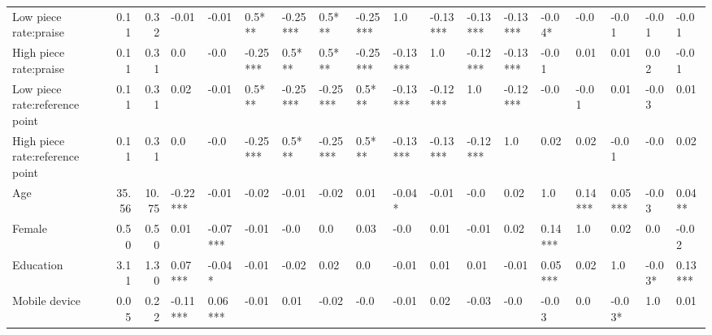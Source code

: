 \begin{tabular}{lrrlllllllllllllll}
Low piece rate:praise           &  0.11 &  0.32 &        -0.01 &          -0.01 &         0.5*** &        -0.25*** &    0.5*** &        -0.25*** &                   1.0 &               -0.13*** &                       -0.13*** &                        -0.13*** &    -0.04* &      -0.0 &     -0.01 &         -0.01 &    -0.01 \\
High piece rate:praise          &  0.11 &  0.31 &          0.0 &           -0.0 &       -0.25*** &          0.5*** &    0.5*** &        -0.25*** &              -0.13*** &                    1.0 &                       -0.12*** &                        -0.13*** &     -0.01 &      0.01 &      0.01 &          0.02 &    -0.01 \\
Low piece rate:reference point  &  0.11 &  0.31 &         0.02 &          -0.01 &         0.5*** &        -0.25*** &  -0.25*** &          0.5*** &              -0.13*** &               -0.12*** &                            1.0 &                        -0.12*** &      -0.0 &     -0.01 &      0.01 &         -0.03 &     0.01 \\
High piece rate:reference point &  0.11 &  0.31 &          0.0 &           -0.0 &       -0.25*** &          0.5*** &  -0.25*** &          0.5*** &              -0.13*** &               -0.13*** &                       -0.12*** &                             1.0 &      0.02 &      0.02 &     -0.01 &          -0.0 &     0.02 \\
Age                             & 35.56 & 10.75 &     -0.22*** &          -0.01 &          -0.02 &           -0.01 &     -0.02 &            0.01 &                -0.04* &                  -0.01 &                           -0.0 &                            0.02 &       1.0 &   0.14*** &   0.05*** &         -0.03 &   0.04** \\
Female                          &  0.50 &  0.50 &         0.01 &       -0.07*** &          -0.01 &            -0.0 &       0.0 &            0.03 &                  -0.0 &                   0.01 &                          -0.01 &                            0.02 &   0.14*** &       1.0 &      0.02 &           0.0 &    -0.02 \\
Education                       &  3.11 &  1.30 &      0.07*** &         -0.04* &          -0.01 &           -0.02 &      0.02 &             0.0 &                 -0.01 &                   0.01 &                           0.01 &                           -0.01 &   0.05*** &      0.02 &       1.0 &        -0.03* &  0.13*** \\
Mobile device                   &  0.05 &  0.22 &     -0.11*** &        0.06*** &          -0.01 &            0.01 &     -0.02 &            -0.0 &                 -0.01 &                   0.02 &                          -0.03 &                            -0.0 &     -0.03 &       0.0 &    -0.03* &           1.0 &     0.01 \\

\end{tabular}
